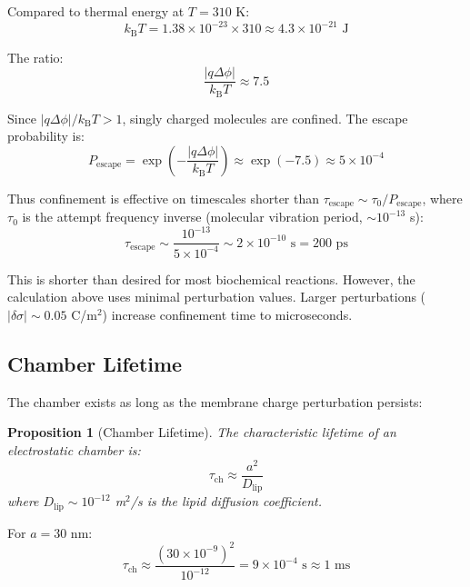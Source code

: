\documentclass[twocolumn,10pt,aps,prd,superscriptaddress,floatfix,nofootinbib]{revtex4-2}
\newtheorem{proposition}[theorem]{Proposition}
\theoremstyle{remark}
\newcommand{\kB}{k_{\mathrm{B}}}
\newcommand{\taucham}{\tau_{\mathrm{ch}}}
\begin{document}
Compared to thermal energy at $T = 310$ K:
\begin{equation}
\kB T = 1.38 \times 10^{-23} \times 310 \approx 4.3 \times 10^{-21} \text{ J}
\end{equation}

The ratio:
\begin{equation}
\frac{|q\Delta\phi|}{\kB T} \approx 7.5
\end{equation}

Since $|q\Delta\phi|/\kB T > 1$, singly charged molecules are confined. The escape probability is:
\begin{equation}
P_{\mathrm{escape}} = \exp\left(-\frac{|q\Delta\phi|}{\kB T}\right) \approx \exp(-7.5) \approx 5 \times 10^{-4}
\end{equation}

Thus confinement is effective on timescales shorter than $\tau_{\mathrm{escape}} \sim \tau_0 / P_{\mathrm{escape}}$, where $\tau_0$ is the attempt frequency inverse (molecular vibration period, $\sim 10^{-13}$ s):
\begin{equation}
\tau_{\mathrm{escape}} \sim \frac{10^{-13}}{5 \times 10^{-4}} \sim 2 \times 10^{-10} \text{ s} = 200 \text{ ps}
\end{equation}

This is shorter than desired for most biochemical reactions. However, the calculation above uses minimal perturbation values. Larger perturbations ($|\delta\sigma| \sim 0.05$ C/m$^2$) increase confinement time to microseconds.

\subsection{Chamber Lifetime}

The chamber exists as long as the membrane charge perturbation persists:

\begin{proposition}[Chamber Lifetime]
\label{prop:chamber_lifetime}
The characteristic lifetime of an electrostatic chamber is:
\begin{equation}
\taucham \approx \frac{a^2}{D_{\mathrm{lip}}}
\label{eq:chamber_lifetime}
\end{equation}
where $D_{\mathrm{lip}} \sim 10^{-12}$ m$^2$/s is the lipid diffusion coefficient.
\end{proposition}

For $a = 30$ nm:
\begin{equation}
\taucham \approx \frac{(30 \times 10^{-9})^2}{10^{-12}} = 9 \times 10^{-4} \text{ s} \approx 1 \text{ ms}
\end{equation}
\end{document}
